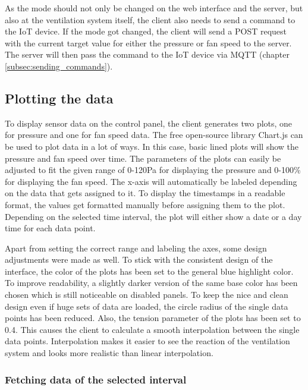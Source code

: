 As the mode should not only be changed on the web interface and the server, but also at the ventilation system itself, the client also needs to send a command to the IoT device. If the mode got changed, the client will send a POST request with the current target value for either the pressure or fan speed to the server. The server will then pass the command to the IoT device via MQTT (chapter \ref{subsec:sending_commands}).



\subsection{Plotting the data}
\label{subsec:plotting_the_data}

To display sensor data on the control panel, the client generates two plots, one for pressure and one for fan speed data. The free open-source library Chart.js can be used to plot data in a lot of ways. In this case, basic lined plots will show the pressure and fan speed over time.  The parameters of the plots can easily be adjusted to fit the given range of 0-120Pa for displaying the pressure and 0-100\% for displaying the fan speed. The x-axis will automatically be labeled depending on the data that gets assigned to it. To display the timestamps in a readable format, the values get formatted manually before assigning them to the plot. Depending on the selected time interval, the plot will either show a date or a day time for each data point.

Apart from setting the correct range and labeling the axes, some design adjustments were made as well. To stick with the consistent design of the interface, the color of the plots has been set to the general blue highlight color. To improve readability, a slightly darker version of the same base color has been chosen which is still noticeable on disabled panels. To keep the nice and clean design even if huge sets of data are loaded, the circle radius of the single data points has been reduced. Also, the tension parameter of the plots has been set to 0.4. This causes the client to calculate a smooth interpolation between the single data points. Interpolation makes it easier to see the reaction of the ventilation system and looks more realistic than linear interpolation.



\subsubsection{Fetching data of the selected interval}
\label{subsec:fetching_data_of_the_selected_interval}

